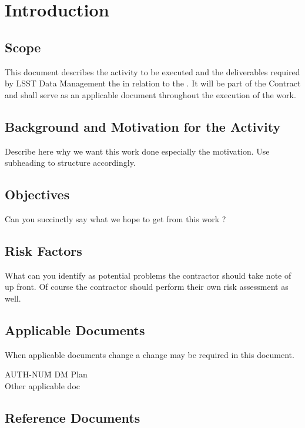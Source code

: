 \section{Introduction \label{sect:intro}}


\subsection{Scope \label{sect:scope}}

This document describes the activity to be executed and the deliverables required by 
LSST Data Management the in relation to the 
\product.
It will be part of the Contract and shall serve as an applicable document throughout the execution of the work.

\subsection{Background and Motivation for the Activity}
Describe here why we want this work done especially the motivation. Use subheading to structure accordingly.

\subsection{Objectives }
Can you succinctly say what we hope to get from this work ?

\subsection{Risk Factors}
What can you identify as potential problems the contractor should take note of up front. Of course the contractor should perform their own risk assessment as well.


\subsection{Applicable Documents \label{sect:ad}}
When applicable documents change a change may be required in this document.
\begin{tabbing}
AUTH-NUM\= \kill 
{} \>	DM Plan  \\
\>	Other applicable doc \\
\end{tabbing}

\subsection{Reference Documents}

